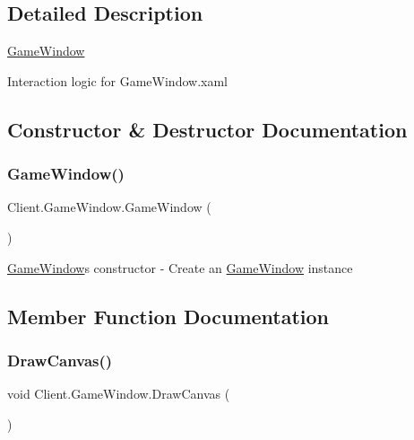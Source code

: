 \subsection{Detailed Description}
\hyperlink{class_client_1_1_game_window}{Game\+Window} 

Interaction logic for Game\+Window.\+xaml

\subsection{Constructor \& Destructor Documentation}
\mbox{\label{class_client_1_1_game_window_afc1d45d2b704a4daf6a669e3e0e28f5f}} 
\subsubsection{\texorpdfstring{Game\+Window()}{GameWindow()}}
{\footnotesize\ttfamily Client.\+Game\+Window.\+Game\+Window (\begin{DoxyParamCaption}{ }\end{DoxyParamCaption})\hspace{0.3cm}{\ttfamily [inline]}}

\hyperlink{class_client_1_1_game_window}{Game\+Window}\textquotesingle{}s constructor -\/ Create an \hyperlink{class_client_1_1_game_window}{Game\+Window} instance 

\subsection{Member Function Documentation}
\mbox{\label{class_client_1_1_game_window_a1b9e58d7bc70991ee087369c7c6bc659}} 
\subsubsection{\texorpdfstring{Draw\+Canvas()}{DrawCanvas()}}
{\footnotesize\ttfamily void Client.\+Game\+Window.\+Draw\+Canvas (\begin{DoxyParamCaption}{ }\end{DoxyParamCaption})\hspace{0.3cm}{\ttfamily [inline]}}

